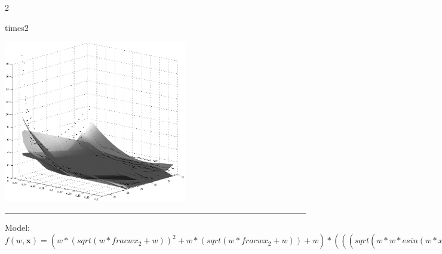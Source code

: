 \documentclass[12pt]{article}
\begin{document}
\begin{multicols}{2}
\begin{bundle}{times2}\end{bundle}

\columnbreak
\includegraphics[width=8cm]{3.eps}
\end{multicols}

\hrule
\vspace{1cm}
Model: $f(w,\mathbf{x})=(w*(sqrt(w*frac{w}{x_2}+w))^2+w*(sqrt(w*frac{w}{x_2}+w))+w)*(((sqrt(w*w*esin(w*x_1+w)p(((sin(w*x_1+w)-w)^2)*w)+w))*(x_1))*(frac{1}{1+efrac{1}{x_2}p(-frac{1}{x_2})}))$
\end{document}
